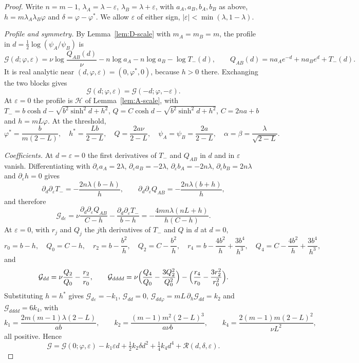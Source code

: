 \begin{proof}
Write $n=m-1$, $\lambda_A=\lambda-\varepsilon$, $\lambda_B=\lambda+\varepsilon$, with $a_A,a_B,b_A,b_B$ as above, $h=m\lambda_A\lambda_B\varphi$ and $\delta=\varphi-\varphi^*$. We allow $\varepsilon$ of either sign, $|\varepsilon|<\min(\lambda,1-\lambda)$.

\textit{Profile and symmetry.} By Lemma~\ref{lem:D-scale} with $m_A=m_B=m$, the profile in $d=\tfrac12\log(\psi_A/\psi_B)$ is
\[
\mathcal G(d;\varphi,\varepsilon)=\nu\log\frac{Q_{AB}(d)}\nu-n\log a_A-n\log a_B-\log T_-(d),
\qquad Q_{AB}(d)=na_Ae^{-d}+na_Be^{d}+T_-(d).
\]
It is real analytic near $(d,\varphi,\varepsilon)=(0,\varphi^*,0)$, because $h>0$ there. Exchanging the two blocks gives
\[
\mathcal G(d;\varphi,\varepsilon)=\mathcal G(-d;\varphi,-\varepsilon).
\]
At $\varepsilon=0$ the profile is $\mathcal H$ of Lemma~\ref{lem:A-scale}, with $T_-=b\cosh d-\sqrt{b^2\sinh^2d+h^2}$, $Q=C\cosh d-\sqrt{b^2\sinh^2d+h^2}$, $C=2na+b$ and $h=mL\varphi$. At the threshold,
\[
\varphi^*=\frac b{m(2-L)},\quad h^*=\frac{Lb}{2-L},\quad Q=\frac{2a\nu}{2-L},\quad
\psi_A=\psi_B=\frac{2a}{2-L},\quad \alpha=\beta=\frac{\lambda}{\sqrt{2-L}} .
\]

\textit{Coefficients.} At $d=\varepsilon=0$ the first derivatives of $T_-$ and $Q_{AB}$ in $d$ and in $\varepsilon$ vanish. Differentiating with $\partial_\varepsilon a_A=2\lambda$, $\partial_\varepsilon a_B=-2\lambda$, $\partial_\varepsilon b_A=-2n\lambda$, $\partial_\varepsilon b_B=2n\lambda$ and $\partial_\varepsilon h=0$ gives
\[
\partial_d\partial_\varepsilon T_-=-\frac{2n\lambda(b-h)}h,\qquad
\partial_d\partial_\varepsilon Q_{AB}=-\frac{2n\lambda(b+h)}h,
\]
and therefore
\[
\mathcal G_{d\varepsilon}=\nu\frac{\partial_d\partial_\varepsilon Q_{AB}}{C-h}-\frac{\partial_d\partial_\varepsilon T_-}{b-h}
=-\frac{4mn\lambda(nL+h)}{h(C-h)} .
\]
At $\varepsilon=0$, with $r_j$ and $Q_j$ the $j$th derivatives of $T_-$ and $Q$ in $d$ at $d=0$,
\[
r_0=b-h,\quad Q_0=C-h,\quad r_2=b-\frac{b^2}h,\quad Q_2=C-\frac{b^2}h,\quad
r_4=b-\frac{4b^2}h+\frac{3b^4}{h^3},\quad Q_4=C-\frac{4b^2}h+\frac{3b^4}{h^3},
\]
and
\[
\mathcal G_{dd}=\nu\frac{Q_2}{Q_0}-\frac{r_2}{r_0},\qquad
\mathcal G_{dddd}=\nu\Bigl(\frac{Q_4}{Q_0}-\frac{3Q_2^2}{Q_0^2}\Bigr)-\Bigl(\frac{r_4}{r_0}-\frac{3r_2^2}{r_0^2}\Bigr).
\]
Substituting $h=h^*$ gives $\mathcal G_{d\varepsilon}=-k_1$, $\mathcal G_{dd}=0$, $\mathcal G_{dd\varphi}=mL\,\partial_h\mathcal G_{dd}=k_2$ and $\mathcal G_{dddd}=6k_4$, with
\[
k_1=\frac{2m(m-1)\lambda(2-L)}{ab},\qquad
k_2=\frac{(m-1)m^2(2-L)^3}{a\nu b},\qquad
k_4=\frac{2(m-1)m(2-L)^2}{\nu L^2},
\]
all positive. Hence
\[
\mathcal G=\mathcal G(0;\varphi,\varepsilon)-k_1\varepsilon d
+\tfrac12k_2\delta d^2+\tfrac14k_4d^4+\mathcal R(d,\delta,\varepsilon).
\]


\end{proof}
